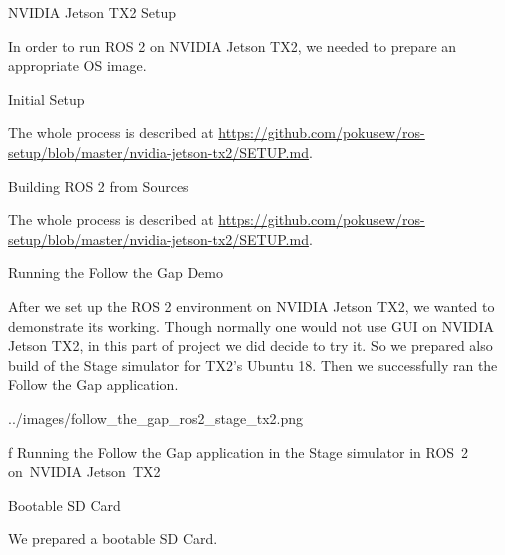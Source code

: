 \chap[jetson] NVIDIA Jetson TX2 Setup

In order to run ROS 2 on NVIDIA Jetson TX2, we needed to prepare an appropriate OS image.


\sec Initial Setup

The whole process is described \nl at \url{https://github.com/pokusew/ros-setup/blob/master/nvidia-jetson-tx2/SETUP.md}.


\sec Building ROS 2 from Sources

The whole process is described \nl at \url{https://github.com/pokusew/ros-setup/blob/master/nvidia-jetson-tx2/SETUP.md}.


\sec Running the Follow the Gap Demo

After we set up the ROS 2 environment on NVIDIA Jetson TX2, we wanted to demonstrate its working.
Though normally one would not use GUI on NVIDIA Jetson TX2, in this part of project we did decide to try it.
So we prepared also build of the Stage simulator for TX2's Ubuntu 18.
Then we successfully ran the Follow the Gap application.

\midinsert
{}
\picw=14cm \cinspic ../images/follow_the_gap_ros2_stage_tx2.png
\caption/f Running the Follow the Gap application in the Stage simulator in ROS~2 on~NVIDIA Jetson~TX2
\endinsert


\sec Bootable SD Card

We prepared a bootable SD Card.


